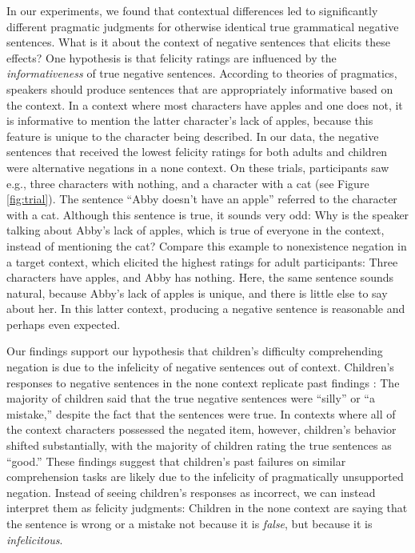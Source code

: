 \documentclass[man, noapacite]{apa2}
\begin{document}
In our experiments, we found that contextual differences led to significantly different pragmatic judgments for otherwise identical true grammatical negative sentences. What is it about the context of negative sentences that elicits these effects? One hypothesis is that felicity ratings are influenced by the \emph{informativeness} of true negative sentences. According to theories of pragmatics, speakers should produce sentences that are appropriately informative based on the context. In a context where most characters have apples and one does not, it is informative to mention the latter character's lack of apples, because this feature is unique to the character being described. In our data, the negative sentences that received the lowest felicity ratings for both adults and children were alternative negations in a none context. On these trials, participants saw e.g., three characters with nothing, and a character with a cat (see Figure \ref{fig:trial}). The sentence ``Abby doesn't have an apple'' referred to the character with a cat. Although this sentence is true, it sounds very odd: Why is the speaker talking about Abby's lack of apples, which is true of everyone in the context, instead of mentioning the cat? Compare this example to nonexistence negation in a target context, which elicited the highest ratings for adult participants: Three characters have apples, and Abby has nothing. Here, the same sentence sounds  natural, because Abby's lack of apples is unique, and there is little else to say about her. In this latter context, producing a negative sentence is reasonable and perhaps even expected.

Our findings support our hypothesis that children's difficulty comprehending negation is due to the infelicity of negative sentences out of context.  Children's responses to negative sentences in the none context replicate past findings \cite{kim1985}: The majority of children said that the true negative sentences were ``silly'' or ``a mistake,'' despite the fact that the sentences were true. In contexts where all of the context characters possessed the negated item, however, children's behavior shifted substantially, with the majority of children rating the true sentences as ``good.'' These findings suggest that children's past failures on similar comprehension tasks are likely due to the infelicity of pragmatically unsupported negation. Instead of seeing children's responses as incorrect, we can instead interpret them as felicity judgments: Children in the none context are saying that the sentence is wrong or a mistake not because it is \emph{false}, but because it is \emph{infelicitous}.
\end{document}
